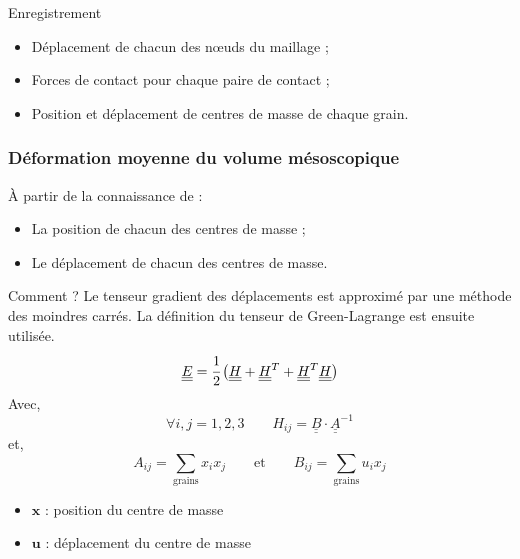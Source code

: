 \documentclass[8pt]{beamer}
\def\doubleunderline#1{\underline{\underline{#1}}}
\begin{document}
\begin{frame}
\begin{minipage}[c]{.39\textwidth}
	\end{minipage}
	\vfill
	\begin{block}{Enregistrement}
		\begin{itemize}[label=$\rightarrow$]
			\item Déplacement de chacun des n\oe{}uds du maillage ;
			\item Forces de contact pour chaque paire de contact ;
			\item Position et déplacement de centres de masse de chaque grain.
		\end{itemize}
	\end{block}\vfill
\end{frame}
\begin{frame}
	\frametitle{Déformation moyenne du volume mésoscopique}
	\begin{block}{\`A partir de la connaissance de :}
		\begin{itemize}[label=$\rightarrow$]
			\item La position de chacun des centres de masse ;
			\item Le déplacement de chacun des centres de masse.
		\end{itemize}
	\end{block}
	\begin{block}{Comment ?}
		Le tenseur gradient des déplacements est approximé par une méthode des moindres carrés. La définition du tenseur de Green-Lagrange est ensuite utilisée.
		$$
		\doubleunderline{E}
		= \cfrac{1}{2}\left( \doubleunderline{H} + \doubleunderline{H}^T + \doubleunderline{H}^T \doubleunderline{H} \right)
		$$
		Avec,
		$$
		\forall i,j = 1,2,3\qquad
		H_{ij} = \doubleunderline{B} \cdot \doubleunderline{A}^{-1}
		$$
		et,
		$$
		A_{ij} = \sum_\text{grains} x_i x_j
		\qquad\text{et}\qquad
		B_{ij} = \sum_\text{grains} u_i x_j
		$$
		\begin{itemize}[label=$\rightarrow$]
			\item $\bm{x}$ : position du centre de masse
			\item $\bm{u}$ : déplacement du centre de masse
		\end{itemize}
	\end{block}
\end{frame}
\end{document}
